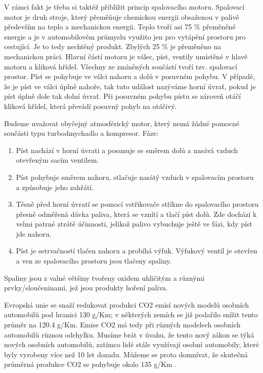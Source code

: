 \documentclass[a4paper, 11pt]{article}
\begin{document}
V rámci fakt je třeba si taktéž přiblížit princip spalovacího motoru. Spalovací motor je druh stroje, který přeměňuje chemickou energii obsaženou v palivě především na teplo a mechanickou energii. Teplo tvoří asi 75 \% přeměněné energie a je v automobilovém průmyslu využito jen pro vytápění prostoru pro cestující. Je to tedy nechtěný produkt. Zbylých 25 \% je přeměněno na mechanickou práci. Hlavní částí motoru je válec, píst, ventily umístěné v hlavě motoru a kliková hřídel. Všechny ze zmíněných součástí tvoří tzv. spalovací prostor.
Píst se pohybuje ve válci nahoru a dolů v posuvném pohybu. V případě, že je píst ve válci úplně nahoře, tak tuto událost nazýváme horní úvrať, pokud je píst úplně dole tak dolní úvrať. Při posuvném pohybu pístu se zároveň otáčí kliková hřídel, která převádí posuvný pohyb na otáčivý. 

Budeme uvažovat obyčejný atmosférický motor, který nemá žádné pomocné součásti typu turbodmychadlo a kompresor. 
Fáze:
\begin{enumerate}
    \item Píst nachází v horní úvrati a posunuje se směrem dolů a nasává vzduch otevřeným sacím ventilem.
    \item Píst pohybuje směrem nahoru, stlačuje nasátý vzduch v spalovacím prostoru a způsobuje jeho zahřátí.
    \item Těsně před horní úvratí se pomocí vstřikovače stříkne do spalovacího prostoru přesně odměřená dávka paliva, která se vznítí a tlačí píst dolů. Zde dochází k velmi patrné ztrátě účinnosti, jelikož palivo vybuchuje ještě ve fázi, kdy píst jde nahoru.
    \item Píst je setrvačností tlačen nahoru a probíhá výfuk. Výfukový ventil je otevřen a ven ze spalovacího prostoru jsou tlačeny spaliny.
\end{enumerate}

Spaliny jsou z valné většiny tvořeny oxidem uhličitým a různými prvky/sloučeninami, jež jsou produkty hoření paliva.

Evropská unie se snaží redukovat produkci CO2 emisí nových modelů osobních automobilů pod hranici 130 g/Km; v některých zemích se již podařilo snížit tento průměr na 120.4 g/Km. Emise CO2 má tedy při různých modelech osobních automobilů různou odchylku. Musíme brát v úvahu, že tento nový zákon se týká nových osobních automobilů, zatímco lidé stále využívají osobní automobily, které byly vyrobeny více než 10 let dozadu. Můžeme se proto domnívat, že skutečná průměrná produkce CO2 se pohybuje okolo 135 g/Km \cite{ultimatespecs.com}.
\end{document}
